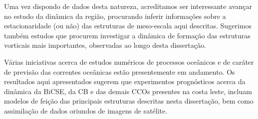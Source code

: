 Uma vez dispondo de dados desta natureza, acreditamos ser interessante avançar no estudo da dinâmica da
região, procurando inferir informações sobre a estacionaridade (ou não) das estruturas de meso-escala
aqui descritas. Sugerimos também estudos que procurem investigar a dinâmica de formação das estruturas
vorticais mais importantes, observadas ao longo desta dissertação. 

Várias iniciativas acerca de estudos numéricos de processos oceânicos e de caráter de previsão
 das correntes oceânicas estão presentemente 
em andamento. Os resultados aqui apresentados sugerem que experimentos prognósticos acerca da 
dinâmica da BiCSE, da CB e das demais CCOs presentes na costa leste, incluam modelos de feição
das principais estruturas descritas nesta dissertação, bem como assimilação de dados oriundos de imagens de satélite. 




 
